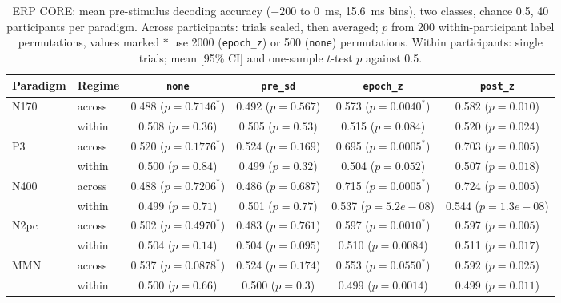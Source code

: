 \begin{table}[t]
\centering
\caption{ERP CORE: mean pre-stimulus decoding accuracy ($-200$ to $0$~ms, 15.6~ms bins), two classes, chance 0.5, 40 participants per paradigm. Across participants: trials scaled, then averaged; $p$ from 200 within-participant label permutations, values marked $\ast$ use 2000 (\texttt{epoch\_z}) or 500 (\texttt{none}) permutations. Within participants: single trials; mean [95\% CI] and one-sample $t$-test $p$ against 0.5.}
\label{tab:erpcore}
\begin{tabular}{llcccc}
\toprule
Paradigm & Regime & \texttt{none} & \texttt{pre\_sd} & \texttt{epoch\_z} & \texttt{post\_z} \\
\midrule
\multirow{2}{*}{N170} & across & 0.488 ($p=0.7146^{\ast}$) & 0.492 ($p=0.567$) & 0.573 ($p=0.0040^{\ast}$) & 0.582 ($p=0.010$) \\
 & within & 0.508 ($p=0.36$) & 0.505 ($p=0.53$) & 0.515 ($p=0.084$) & 0.520 ($p=0.024$) \\
\multirow{2}{*}{P3} & across & 0.520 ($p=0.1776^{\ast}$) & 0.524 ($p=0.169$) & 0.695 ($p=0.0005^{\ast}$) & 0.703 ($p=0.005$) \\
 & within & 0.500 ($p=0.84$) & 0.499 ($p=0.32$) & 0.504 ($p=0.052$) & 0.507 ($p=0.018$) \\
\multirow{2}{*}{N400} & across & 0.488 ($p=0.7206^{\ast}$) & 0.486 ($p=0.687$) & 0.715 ($p=0.0005^{\ast}$) & 0.724 ($p=0.005$) \\
 & within & 0.499 ($p=0.71$) & 0.501 ($p=0.77$) & 0.537 ($p=5.2e-08$) & 0.544 ($p=1.3e-08$) \\
\multirow{2}{*}{N2pc} & across & 0.502 ($p=0.4970^{\ast}$) & 0.483 ($p=0.761$) & 0.597 ($p=0.0010^{\ast}$) & 0.597 ($p=0.005$) \\
 & within & 0.504 ($p=0.14$) & 0.504 ($p=0.095$) & 0.510 ($p=0.0084$) & 0.511 ($p=0.017$) \\
\multirow{2}{*}{MMN} & across & 0.537 ($p=0.0878^{\ast}$) & 0.524 ($p=0.174$) & 0.553 ($p=0.0550^{\ast}$) & 0.592 ($p=0.025$) \\
 & within & 0.500 ($p=0.66$) & 0.500 ($p=0.3$) & 0.499 ($p=0.0014$) & 0.499 ($p=0.011$) \\
\bottomrule
\end{tabular}
\end{table}
